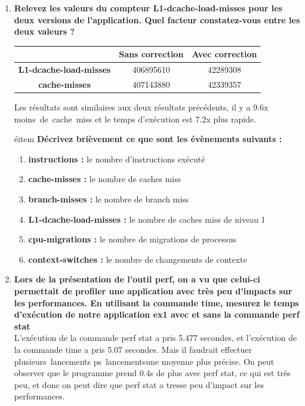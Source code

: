 \documentclass[
	a4paper, %
	10pt, %
]{CSUniSchoolLabReport}
\begin{document}
\begin{enumerate}[label=\textbf{\arabic*}]
\item \textbf{Relevez les valeurs du compteur L1-dcache-load-misses pour les deux versions de l’application. Quel facteur constatez-vous entre les deux valeurs ?}

\begin{center}
	\begin{tabular}{|c|c|c|}
		\hline
		& \textbf{Sans correction} & \textbf{Avec correction} \\
		\hline
		\textbf{L1-dcache-load-misses} & 406895610 & 42289308 \\
		\hline
		\textbf{cache-misses} & 407143880 & 42339357 \\
		\hline
	\end{tabular}
\end{center}
Les r\'esultats sont similaires aux deux r\'esultats pr\'ec\'edents, il y a 9.6x moins\ de\ cache\ miss et le temps d'ex\'ecution est 7.2x plus rapide.


\'eitem \textbf{Décrivez brièvement ce que sont les évènements suivants :}
\begin{enumerate}[label=\textbf{\alph*}]
	\item \textbf{instructions :} le nombre d'instructions ex\'ecuté
	\item \textbf{cache-misses :} le nombre de caches miss
	\item \textbf{branch-misses :} le nombre de branch miss
	\item \textbf{L1-dcache-load-misses :} le nombre de caches miss de niveau 1
	\item \textbf{cpu-migrations :} le nombre de migrations de processus
	\item \textbf{context-switches :} le nombre de changements de contexte
\end{enumerate}

\item \textbf{Lors de la présentation de l’outil perf, on a vu que celui-ci permettait de profiler une application avec très peu d’impacts sur les performances. En utilisant la commande time, mesurez le temps d’exécution de notre application ex1 avec et sans la commande perf stat}\\
L'ex\'ecution de la commande perf stat a pris 5.477 secondes, et l'ex\'ecution de la commande time a pris 5.07 secondes. Mais il faudrait effectuer plusieurs\ lancements ps\ lancementsune moyenne plus pr\'ecise.
On peut observer que le programme prend 0.4s de plus avec perf stat, ce qui est tr\`es peu, et donc on peut dire que perf stat a tresse peu d'impact sur les performances.

\end{enumerate}
\end{document}
